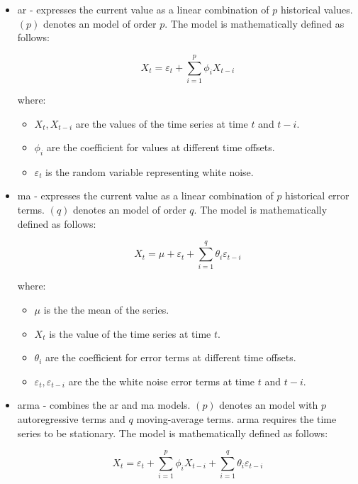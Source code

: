 \begin{itemize}
    \item \Gls{ar} \cite{whittle} - expresses the current value as a linear combination of $p$ historical values. $(p)$ denotes an  model of order $p$. The model is mathematically defined as follows:

        $$X_{t} =  \varepsilon_{t} + \sum_{i=1}^{p}\phi_{i}X_{t-i}$$

        where:
        \begin{itemize}
            \item $X_{t}, X_{t-i}$ are the values of the time series at time $t$ and $t-i$.
            \item $\phi_{i}$ are the coefficient for values at different time offsets.
            \item $\varepsilon_{t}$ is the random variable representing white noise.
        \end{itemize}
    \item \Gls{ma} \cite{whittle} - expresses the current value as a linear combination of $p$ historical error terms. $(q)$ denotes an  model of order $q$. The model is mathematically defined as follows:
        
        $$X_{t} = \mu + \varepsilon_{t} + \sum_{i=1}^{q}\theta_{i}\varepsilon_{t-i}$$
        
        where:
        \begin{itemize}
            \item $\mu$ is the the mean of the series.
            \item $X_{t}$ is the value of the time series at time $t$.
            \item $\theta_{i}$ are the coefficient for error terms at different time offsets.
            \item $\varepsilon_{t}, \varepsilon_{t-i}$ are the the white noise error terms at time $t$ and $t-i$.
        \end{itemize}

    \item \Gls{arma} \cite{whittle} - combines the \gls{ar} and \gls{ma} models. $(p)$ denotes an model with $p$ autoregressive terms and $q$ moving-average terms. \gls{arma} requires the time series to be stationary. The model is mathematically defined as follows:

        $$X_{t} =  \varepsilon_{t} + \sum_{i=1}^{p}\phi_{i}X_{t-i} + \sum_{i=1}^{q}\theta_{i}\varepsilon_{t-i}$$


\end{itemize}
